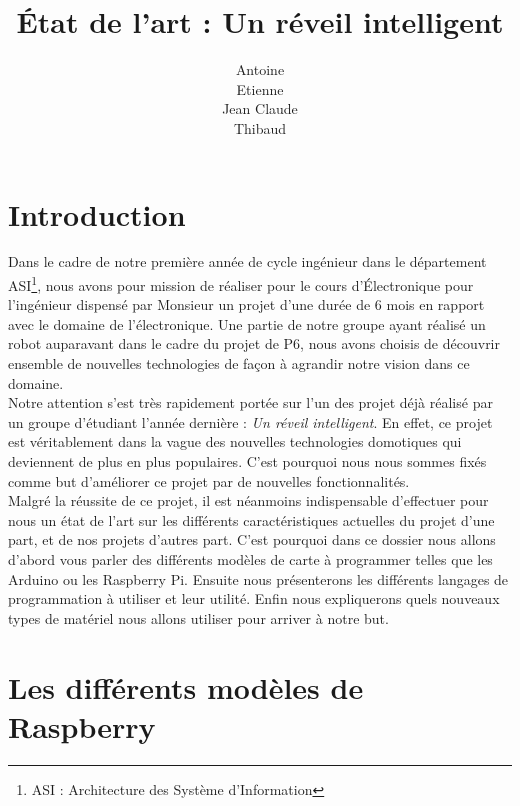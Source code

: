 \documentclass[a4paper, 12pt, french]{article}
\title{État de l'art : Un réveil intelligent}
\author{
	Antoine \bsc{Augusti}\\
	Etienne \bsc{Batise}\\
	Jean Claude \bsc{Bernard}\\
	Thibaud \bsc{Dauce}\\}
\date{}
\begin{document}
	
\maketitle
\thispagestyle{empty}
\pagebreak

\tableofcontents
\thispagestyle{empty}
\pagebreak

\setcounter{page}{1}

\section*{Introduction} %
\label{sec:introduction}

Dans le cadre de notre première année de cycle ingénieur dans le département ASI\footnote{ASI : Architecture des Système d'Information}, nous avons pour mission de réaliser pour le cours d'Électronique pour l'ingénieur dispensé par Monsieur  un projet d'une durée de 6 mois en rapport avec le domaine de l'électronique. Une partie de notre groupe ayant réalisé un robot auparavant dans le cadre du projet de P6, nous avons choisis de découvrir ensemble de nouvelles technologies de façon à agrandir notre vision dans ce domaine.\\

Notre attention s'est très rapidement portée sur l'un des projet déjà réalisé par un groupe d'étudiant l'année dernière : \emph{Un réveil intelligent}. En effet, ce projet est véritablement dans la vague des nouvelles technologies domotiques qui deviennent de plus en plus populaires. C'est pourquoi nous nous sommes fixés comme but d'améliorer ce projet par de nouvelles fonctionnalités. \\

Malgré la réussite de ce projet, il est néanmoins indispensable d'effectuer pour nous un état de l'art sur les différents caractéristiques actuelles du projet d'une part, et de nos projets d'autres part. C'est pourquoi dans ce dossier nous allons d'abord vous parler des différents modèles de carte à programmer telles que les Arduino ou les Raspberry Pi. Ensuite nous présenterons les différents langages de programmation à utiliser et leur utilité. Enfin nous expliquerons quels nouveaux types de matériel nous allons utiliser pour arriver à notre but.\\




\pagebreak
\section{Les différents modèles de Raspberry} %
\label{sec:les_diff_rents_mod_les_de_raspberry}
\end{document}
